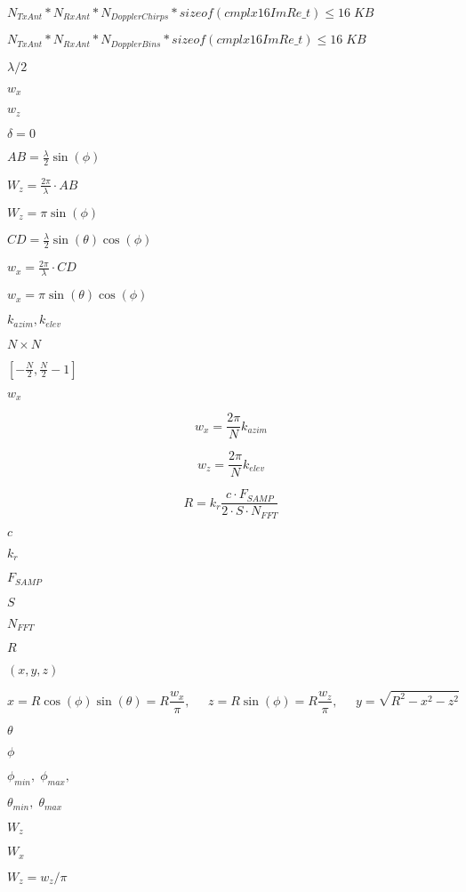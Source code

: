 \documentclass{article}
\begin{document}
$N_{TxAnt}*N_{RxAnt}*N_{DopplerChirps}*sizeof(cmplx16ImRe\_t) \leq 16\;KB$
\pagebreak

$N_{TxAnt}*N_{RxAnt}*N_{DopplerBins}*sizeof(cmplx16ImRe\_t) \leq 16\;KB$
\pagebreak

$ \lambda/2 $
\pagebreak

$w_x$
\pagebreak

$w_z$
\pagebreak

$\delta=0$
\pagebreak

$AB = \frac{\lambda}{2} \sin (\phi)$
\pagebreak

$W_z = \frac{2\pi}{\lambda} \cdot AB$
\pagebreak

$W_z = \pi \sin (\phi)$
\pagebreak

$CD = \frac{\lambda}{2} \sin (\theta) \cos (\phi)$
\pagebreak

$w_x = \frac{2\pi}{\lambda} \cdot CD$
\pagebreak

$w_x = \pi \sin (\theta) \cos (\phi)$
\pagebreak

$k_{azim},k_{elev}$
\pagebreak

$N{\times}N$
\pagebreak

$[-\frac{N}{2}, \frac{N}{2}-1]$
\pagebreak

$ w_x $
\pagebreak

\[ w_x = \frac{2\pi}{N}k_{azim} \]
\pagebreak

\[ w_z= \frac{2\pi}{N}k_{elev} \]
\pagebreak

\[ R=k_r\frac{c \cdot F_{SAMP}}{2 \cdot S \cdot N_{FFT}} \]
\pagebreak

$c$
\pagebreak

$k_r$
\pagebreak

$F_{SAMP}$
\pagebreak

$S$
\pagebreak

$N_{FFT}$
\pagebreak

$R$
\pagebreak

$(x,y,z)$
\pagebreak

\[ x = R\cos(\phi)\sin(\theta) = R\frac{w_x}{\pi}, \;\;\;\;\; z = R\sin(\phi) = R\frac{w_z}{\pi},\;\;\;\;\; y = \sqrt{R^2-x^2-z^2} \]
\pagebreak

$\theta$
\pagebreak

$\phi$
\pagebreak

$\phi_{min},\;\phi_{max},$
\pagebreak

$\theta_{min},\;\theta_{max}$
\pagebreak

$W_z$
\pagebreak

$W_x$
\pagebreak

$W_z = w_z/\pi$
\pagebreak
\end{document}
